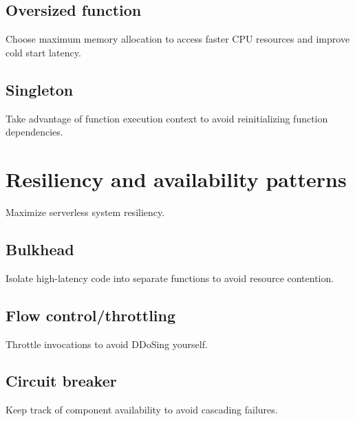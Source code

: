 \subsection{Oversized function} \label{subsec:OversizedFunction}

Choose maximum memory allocation to access faster CPU resources and improve cold start latency.

\subsection{Singleton} \label{subsec:Singleton}

Take advantage of function execution context to avoid reinitializing function dependencies.

\section{Resiliency and availability patterns} \label{sec:resiliencyPatterns}

Maximize serverless system resiliency.

\subsection{Bulkhead} \label{subsec:Bulkhead}

Isolate high-latency code into separate functions to avoid resource contention.

\subsection{Flow control/throttling} \label{subsec:Flow control/throttling}

Throttle invocations to avoid DDoSing yourself.

\subsection{Circuit breaker} \label{subsec:Circuit breaker}

Keep track of component availability to avoid cascading failures.


